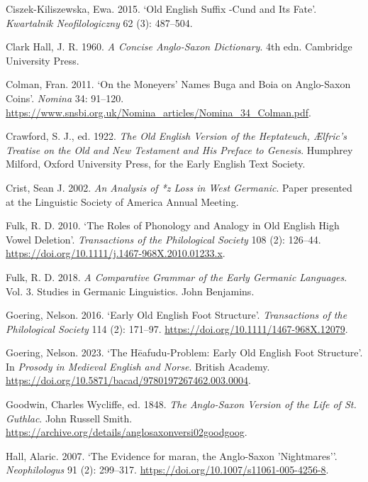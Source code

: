 \documentclass[
  british,
  a4paper,
]{article}
\newlength{\cslhangindent}
\newenvironment{CSLReferences}[2] %
 {\begin{list}{}{%
  \setlength{\itemindent}{0pt}
  \setlength{\leftmargin}{0pt}
  \setlength{\parsep}{0pt}
  \ifodd #1
   \setlength{\leftmargin}{\cslhangindent}
   \setlength{\itemindent}{-1\cslhangindent}
  \fi
  \setlength{\itemsep}{#2\baselineskip}}}
 {\end{list}}
\begin{document}
\begin{CSLReferences}{1}{1}
Ciszek-Kiliszewska, Ewa. 2015. {`Old {English} Suffix {-Cund} and Its
Fate'}. \emph{Kwartalnik Neofilologiczny} 62 (3): 487--504.

Clark Hall, J. R. 1960. \emph{A Concise {Anglo-Saxon} Dictionary}. 4th
edn. Cambridge University Press.

Colman, Fran. 2011. {`On the Moneyers' Names {Buga} and {Boia} on
{Anglo-Saxon} Coins'}. \emph{Nomina} 34: 91--120.
\url{https://www.snsbi.org.uk/Nomina_articles/Nomina_34_Colman.pdf}.

Crawford, S. J., ed. 1922. \emph{The {Old English} Version of the
Heptateuch, {{Æ}lfric}'s Treatise on the Old and New Testament and His
Preface to Genesis}. Humphrey Milford, Oxford University Press, for the
Early English Text Society.

Crist, Sean J. 2002. \emph{An Analysis of *{z} Loss in {West Germanic}}.
Paper presented at the Linguistic Society of America Annual Meeting.

Fulk, R. D. 2010. {`The Roles of Phonology and Analogy in {Old English}
High Vowel Deletion'}. \emph{Transactions of the Philological Society}
108 (2): 126--44.
\url{https://doi.org/10.1111/j.1467-968X.2010.01233.x}.

Fulk, R. D. 2018. \emph{A Comparative Grammar of the Early {Germanic}
Languages}. Vol. 3. Studies in Germanic Linguistics. John Benjamins.

Goering, Nelson. 2016. {`Early {Old English} Foot Structure'}.
\emph{Transactions of the Philological Society} 114 (2): 171--97.
\url{https://doi.org/10.1111/1467-968X.12079}.

Goering, Nelson. 2023. {`The {Hēafudu}-Problem: Early {Old English} Foot
Structure'}. In \emph{Prosody in Medieval {English} and {Norse}}.
British Academy.
\url{https://doi.org/10.5871/bacad/9780197267462.003.0004}.

Goodwin, Charles Wycliffe, ed. 1848. \emph{The {Anglo-Saxon} Version of
the Life of {St. Guthlac}}. John Russell Smith.
\url{https://archive.org/details/anglosaxonversi02goodgoog}.

Hall, Alaric. 2007. {`The Evidence for {maran}, the {Anglo-Saxon}
'Nightmares''}. \emph{Neophilologus} 91 (2): 299--317.
\url{https://doi.org/10.1007/s11061-005-4256-8}.


\end{CSLReferences}
\end{document}
